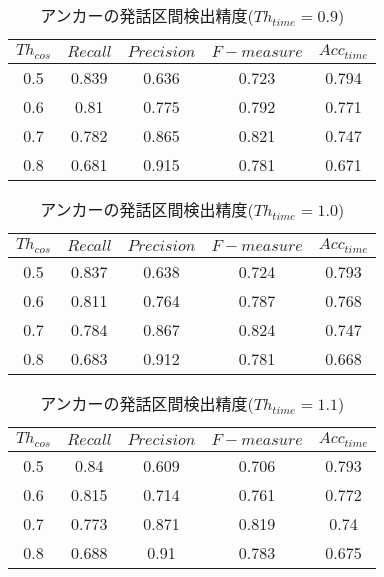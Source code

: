 \begin{table}[H]
  \begin{center}
    \caption{アンカーの発話区間検出精度($Th_{time}=0.9$) \label{table:result_get_anchor09}}
    \begin{tabular}{|c||c|c|c|c|} \hline
      $Th_{cos}$ & $Recall$ & $Precision$ & $F-measure$ & $Acc_{time}$\\ \hline
0.5 & 0.839 & 0.636 & 0.723 & 0.794 \\ \hline
0.6 & 0.81 & 0.775 & 0.792 & 0.771 \\ \hline
0.7 & 0.782 & 0.865 & 0.821 & 0.747 \\ \hline
0.8 & 0.681 & 0.915 & 0.781 & 0.671 \\ \hline

    \end{tabular}
  \end{center}
\end{table}

\begin{table}[H]
  \begin{center}
    \caption{アンカーの発話区間検出精度($Th_{time}=1.0$) \label{table:result_get_anchor10}}
    \begin{tabular}{|c||c|c|c|c|} \hline
      $Th_{cos}$ & $Recall$ & $Precision$ & $F-measure$ & $Acc_{time}$\\ \hline
0.5 & 0.837 & 0.638 & 0.724 & 0.793 \\ \hline
0.6 & 0.811 & 0.764 & 0.787 & 0.768 \\ \hline
0.7 & 0.784 & 0.867 & 0.824 & 0.747 \\ \hline
0.8 & 0.683 & 0.912 & 0.781 & 0.668 \\ \hline

    \end{tabular}
  \end{center}
\end{table}

\begin{table}[H]
  \begin{center}
    \caption{アンカーの発話区間検出精度($Th_{time}=1.1$) \label{table:result_get_anchor11}}
    \begin{tabular}{|c||c|c|c|c|} \hline
      $Th_{cos}$ & $Recall$ & $Precision$ & $F-measure$ & $Acc_{time}$\\ \hline
0.5 & 0.84 & 0.609 & 0.706 & 0.793 \\ \hline
0.6 & 0.815 & 0.714 & 0.761 & 0.772 \\ \hline
0.7 & 0.773 & 0.871 & 0.819 & 0.74 \\ \hline
0.8 & 0.688 & 0.91 & 0.783 & 0.675 \\ \hline

    \end{tabular}
  \end{center}
\end{table}


